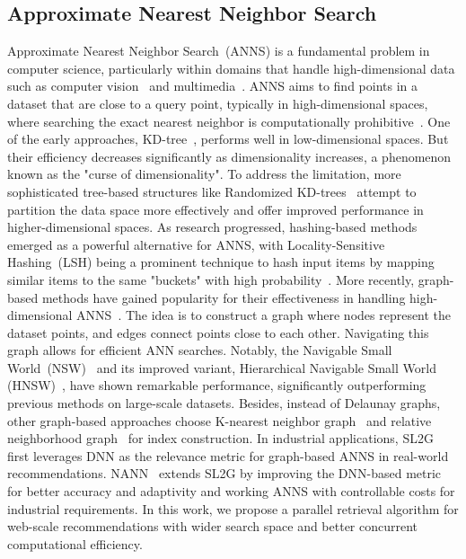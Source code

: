 \subsection{Approximate Nearest Neighbor Search}
Approximate Nearest Neighbor Search~(ANNS) is a fundamental problem in computer science, particularly within domains that handle high-dimensional data such as computer vision~\cite{ben2015approximate} and multimedia~\cite{ferhatosmanoglu2001approximate}. ANNS aims to find points in a dataset that are close to a query point, typically in high-dimensional spaces, where searching the exact nearest neighbor is computationally prohibitive~\cite{liu2004investigation}.
One of the early approaches, KD-tree~\cite{friedman1977algorithm}, performs well in low-dimensional spaces. But their efficiency decreases significantly as dimensionality increases, a phenomenon known as the "curse of dimensionality". To address the limitation, more sophisticated tree-based structures like Randomized KD-trees~\cite{silpa2008optimised} attempt to partition the data space more effectively and offer improved performance in higher-dimensional spaces.
As research progressed, hashing-based methods emerged as a powerful alternative for ANNS, with Locality-Sensitive Hashing~(LSH) being a prominent technique to hash input items by mapping similar items to the same "buckets" with high probability~\cite{indyk1998approximate}.
More recently, graph-based methods have gained popularity for their effectiveness in handling high-dimensional ANNS~\cite{wang2021comprehensive}. The idea is to construct a graph where nodes represent the dataset points, and edges connect points close to each other. Navigating this graph allows for efficient ANN searches.
Notably, the Navigable Small World~(NSW)~\cite{malkov2014approximate} and its improved variant, Hierarchical Navigable Small World (HNSW)~\cite{malkov2018efficient}, have shown remarkable performance, significantly outperforming previous methods on large-scale datasets.
Besides, instead of Delaunay graphs, other graph-based approaches choose K-nearest neighbor graph~\cite{fu2016efanna} and relative neighborhood graph~\cite{jayaram2019diskann} for index construction.
In industrial applications, SL2G~\cite{tan2020fast} first leverages DNN as the relevance metric for graph-based ANNS in real-world recommendations.
NANN~\cite{chen2022approximate} extends SL2G by improving the DNN-based metric for better accuracy and adaptivity and working ANNS with controllable costs for industrial requirements.
In this work, we propose a parallel retrieval algorithm for web-scale recommendations with wider search space and better concurrent computational efficiency.